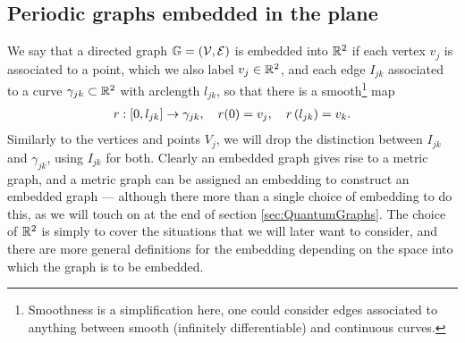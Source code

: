 \subsection{Periodic graphs embedded in the plane} \label{ssec:EmbeddedGraphs}
We say that a directed graph $\mathbb{G}=\left( \mathcal{V}, \mathcal{E} \right)$ is embedded into $\mathbb{R}^2$ if each vertex $v_j$ is associated to a point, which we also label $v_j\in\mathbb{R}^2$, and each edge $I_{jk}$ associated to a curve $\gamma_{jk}\subset\mathbb{R}^2$ with arclength $l_{jk}$, so that there is a smooth\footnote{Smoothness is a simplification here, one could consider edges associated to anything between smooth (infinitely differentiable) and continuous curves.} map
\begin{align} \label{eq:GeneralCurveParam}
	r: \left[ 0,l_{jk} \right] \rightarrow \gamma_{jk}, \quad r(0) = v_j, \quad r\left( l_{jk} \right) = v_k.
\end{align}
Similarly to the vertices and points $V_j$, we will drop the distinction between $I_{jk}$ and $\gamma_{jk}$, using $I_{jk}$ for both.
Clearly an embedded graph gives rise to a metric graph, and a metric graph can be assigned an embedding to construct an embedded graph --- although there more than a single choice of embedding to do this, as we will touch on at the end of section \ref{sec:QuantumGraphs}.
The choice of $\mathbb{R}^2$ is simply to cover the situations that we will later want to consider, and there are more general definitions for the embedding depending on the space into which the graph is to be embedded.

